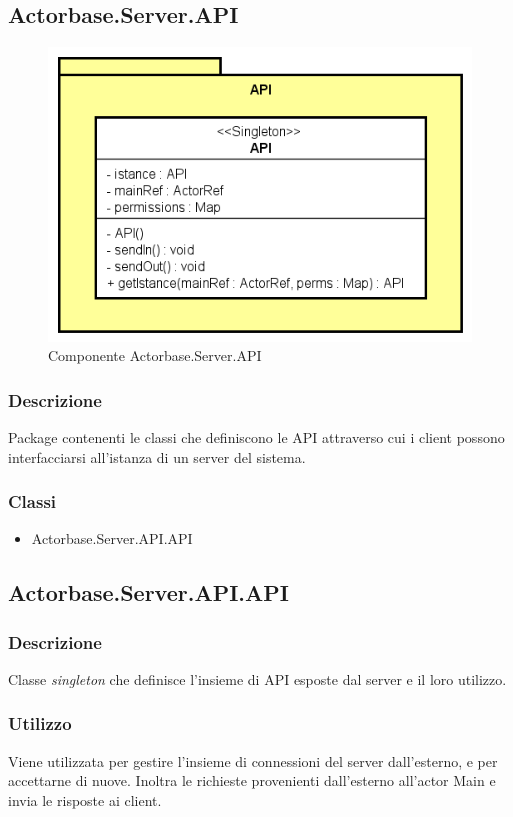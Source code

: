 \documentclass[a4paper]{article}
\begin{document}
		\subsection{Actorbase.Server.API}
			\begin{figure} [H]
			\centering
			\includegraphics[scale=0.70]{Server/Package/APILevel.png}
			\caption{Componente Actorbase.Server.API}
			\end{figure}
			\subsubsection{Descrizione}
				Package contenenti le classi che definiscono le API attraverso cui i client possono interfacciarsi all'istanza di un server del sistema.
			\subsubsection{Classi}
			\begin{itemize}
				\item Actorbase.Server.API.API
			\end{itemize}
			
			\subsection{Actorbase.Server.API.API}
			\subsubsection{Descrizione}
				Classe \emph{singleton} che definisce l'insieme di API esposte dal server e il loro utilizzo.
			\subsubsection{Utilizzo}
				Viene utilizzata per gestire l'insieme di connessioni del server dall'esterno, e per accettarne di nuove. Inoltra le richieste provenienti dall'esterno all'actor Main e invia le risposte ai client.
\end{document}
